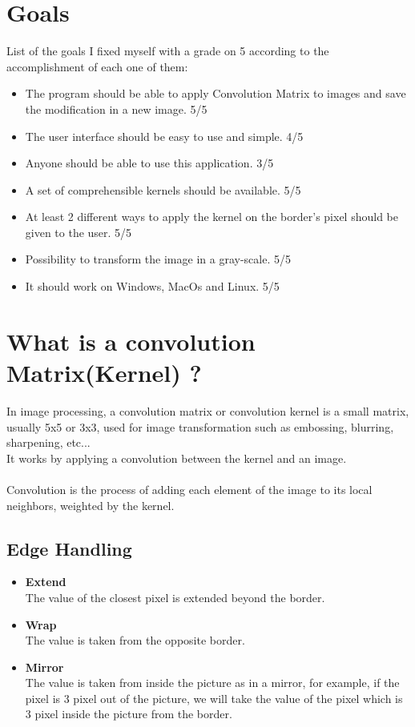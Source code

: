 \documentclass[]{article}
\begin{document}
\section{Goals}
List of the goals I fixed myself with a grade on 5 according to the accomplishment of each one of them:
\begin {itemize}
	\item The program should be able to apply Convolution Matrix to images and save the modification in a new image. 5/5
	\item The user interface should be easy to use and simple. 4/5
	\item Anyone should be able to use this application. 3/5
	\item A set of comprehensible kernels should be available. 5/5
	\item At least 2 different ways to apply the kernel on the border's pixel should be given to the user. 5/5
	\item Possibility to transform the image in a gray-scale. 5/5
	\item It should work on Windows, MacOs and Linux. 5/5

\end {itemize}


\newpage
\section{What is a convolution Matrix(Kernel) ?}
In image processing, a convolution matrix or convolution kernel is a small matrix, usually 5x5 or 3x3, used for
image transformation such as embossing, blurring, sharpening, etc... \\
It works by applying a convolution between the kernel and an image.
\\\\
Convolution is the process of adding each element of the image to its local neighbors, weighted by the kernel.\\

\subsection{Edge Handling}

\begin{itemize}
	\item \textbf{Extend}\\
The value of the closest pixel is extended beyond the border.
	\item \textbf{Wrap}\\
The value is taken from the opposite border.
	\item \textbf{Mirror}\\
The value is taken from inside the picture as in a mirror, for example, if the pixel is 3 pixel out of the picture, we will take the
value of the pixel which is 3 pixel inside the picture from the border.
\end{itemize}
\end{document}
